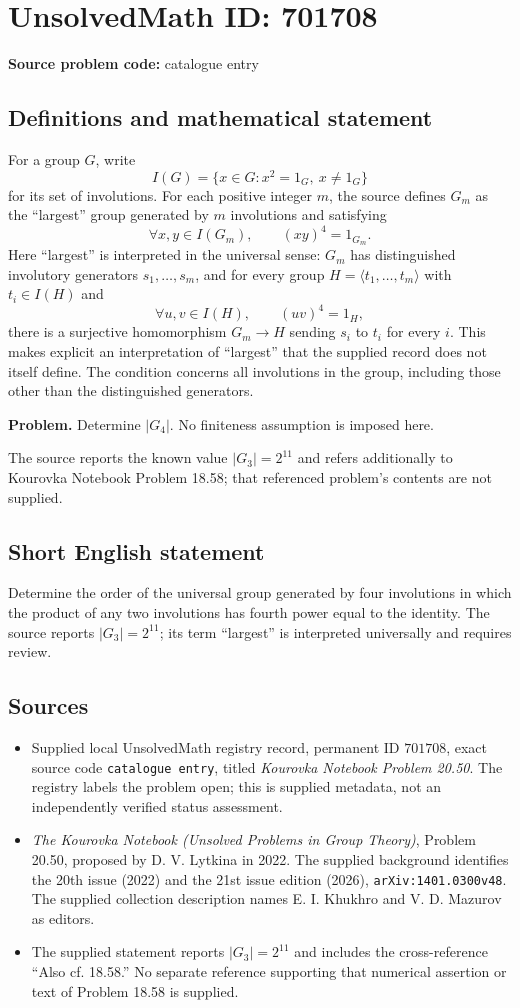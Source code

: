 \documentclass[11pt]{article}
\begin{document}
\section*{UnsolvedMath ID: 701708}
\textbf{Source problem code:} catalogue entry
\subsection{Definitions and mathematical statement}
For a group \(G\), write
\[
I(G)=\{x\in G:x^2=1_G,\ x\ne 1_G\}
\]
for its set of involutions. For each positive integer \(m\), the source defines \(G_m\) as the ``largest'' group generated by \(m\) involutions and satisfying
\[
\forall x,y\in I(G_m),\qquad (xy)^4=1_{G_m}.
\]
Here ``largest'' is interpreted in the universal sense: \(G_m\) has distinguished involutory generators \(s_1,\ldots,s_m\), and for every group \(H=\langle t_1,\ldots,t_m\rangle\) with \(t_i\in I(H)\) and
\[
\forall u,v\in I(H),\qquad (uv)^4=1_H,
\]
there is a surjective homomorphism \(G_m\to H\) sending \(s_i\) to \(t_i\) for every \(i\). This makes explicit an interpretation of ``largest'' that the supplied record does not itself define. The condition concerns all involutions in the group, including those other than the distinguished generators.

\textbf{Problem.} Determine \(\lvert G_4\rvert\). No finiteness assumption is imposed here.

The source reports the known value \(\lvert G_3\rvert=2^{11}\) and refers additionally to Kourovka Notebook Problem 18.58; that referenced problem's contents are not supplied.
\subsection{Short English statement}
Determine the order of the universal group generated by four involutions in which the product of any two involutions has fourth power equal to the identity. The source reports \(\lvert G_3\rvert=2^{11}\); its term ``largest'' is interpreted universally and requires review.
\subsection{Sources}
\begin{itemize}
\item Supplied local UnsolvedMath registry record, permanent ID \(701708\), exact source code \texttt{catalogue entry}, titled \emph{Kourovka Notebook Problem 20.50}. The registry labels the problem open; this is supplied metadata, not an independently verified status assessment.
\item \emph{The Kourovka Notebook (Unsolved Problems in Group Theory)}, Problem 20.50, proposed by D. V. Lytkina in 2022. The supplied background identifies the 20th issue (2022) and the 21st issue edition (2026), \texttt{arXiv:1401.0300v48}. The supplied collection description names E. I. Khukhro and V. D. Mazurov as editors.
\item The supplied statement reports \(\lvert G_3\rvert=2^{11}\) and includes the cross-reference ``Also cf. 18.58.'' No separate reference supporting that numerical assertion or text of Problem 18.58 is supplied.
\end{itemize}
\end{document}
